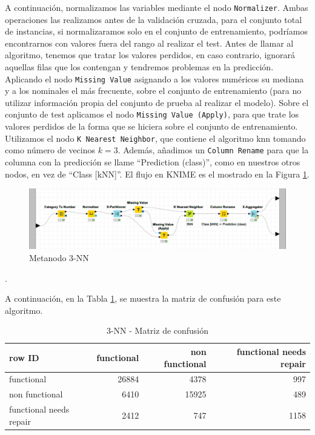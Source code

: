 \documentclass[a4paper, 20pt]{article}
\begin{document}
A continuación, normalizamos las variables mediante el nodo \texttt{Normalizer}. Ambas operaciones las realizamos antes de la validación cruzada, para el conjunto total de instancias, si normalizaramos solo en el conjunto de entrenamiento, podríamos encontrarnos con valores fuera del rango al realizar el test. Antes de llamar al algoritmo, tenemos que tratar los valores perdidos, en caso contrario, ignorará aquellas filas que los contengan y tendremos problemas en la predicción. Aplicando el nodo \texttt{Missing Value} asignando a los valores numéricos su mediana y a los nominales el más frecuente, sobre el conjunto de entrenamiento (para no utilizar información propia del conjunto de prueba al realizar el modelo). Sobre el conjunto de test aplicamos el nodo \texttt{Missing Value (Apply)}, para que trate los valores perdidos de la forma que se hiciera sobre el conjunto de entrenamiento. Utilizamos el nodo \texttt{K Nearest Neighbor}, que contiene el algoritmo knn tomando como número de vecinos $k = 3$. Además, añadimos un \texttt{Column Rename} para que la columna con la predicción se llame ``Prediction (class)'', como en nuestros otros nodos, en vez de ``Class [kNN]''. El flujo en KNIME es el mostrado en la Figura \ref{fig:3nn}.

\begin{figure}[H]
    \centering
    \includegraphics[width=1\textwidth]{3nn}
    \caption{Metanodo 3-NN}
    \label{fig:3nn}
\end{figure}.

A continuación, en la Tabla \ref{tab:CM3nn}, se muestra la matriz de confusión para este algoritmo.

\begin{table}[H]
\centering
\caption{3-NN - Matriz de confusión}
\label{tab:CM3nn}
\begin{tabular}{lrrr}
\toprule
row ID & functional & non functional & functional needs repair\\ \midrule
functional & 26884 & 4378 & 997\\
non functional & 6410 & 15925 & 489\\
functional needs repair & 2412 & 747 & 1158\\
\bottomrule
\end{tabular}
\end{table}
\end{document}
